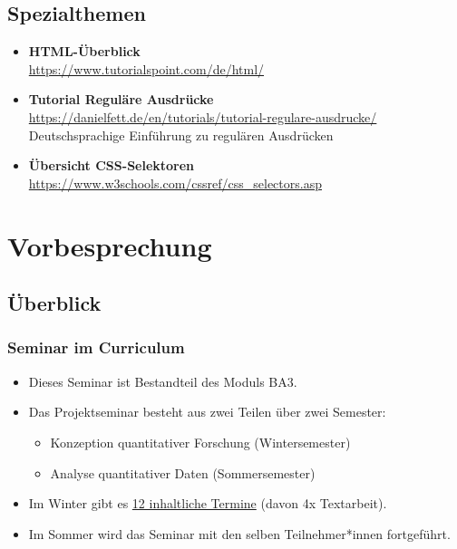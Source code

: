 \documentclass[
  ngerman,
]{article}
\providecommand{\tightlist}{%
  \setlength{\itemsep}{0pt}\setlength{\parskip}{0pt}}
\begin{document}
\hypertarget{spezialthemen}{%
\subsection*{Spezialthemen}\label{spezialthemen}}

\begin{itemize}
\item
  \textbf{HTML-Überblick}\\
  \url{https://www.tutorialspoint.com/de/html/}
\item
  \textbf{Tutorial Reguläre Ausdrücke}\\
  \url{https://danielfett.de/en/tutorials/tutorial-regulare-ausdrucke/}~\\
  Deutschsprachige Einführung zu regulären Ausdrücken
\item
  \textbf{Übersicht CSS-Selektoren}\\
  \url{https://www.w3schools.com/cssref/css_selectors.asp}
\end{itemize}

\hypertarget{vorbesprechung}{%
\section{Vorbesprechung}\label{vorbesprechung}}

\hypertarget{uxfcberblick}{%
\subsection{Überblick}\label{uxfcberblick}}

\hypertarget{seminar-im-curriculum}{%
\subsubsection{Seminar im Curriculum}\label{seminar-im-curriculum}}

\begin{itemize}
\tightlist
\item
  Dieses Seminar ist Bestandteil des Moduls BA3.
\item
  Das Projektseminar besteht aus zwei Teilen über zwei Semester:

  \begin{itemize}
  \tightlist
  \item
    Konzeption quantitativer Forschung (Wintersemester)
  \item
    Analyse quantitativer Daten (Sommersemester)
  \end{itemize}
\item
  Im Winter gibt es \protect\hyperlink{terminuxfcberblick}{12 inhaltliche Termine} (davon 4x Textarbeit).
\item
  Im Sommer wird das Seminar mit den selben Teilnehmer*innen fortgeführt.
\end{itemize}
\end{document}

